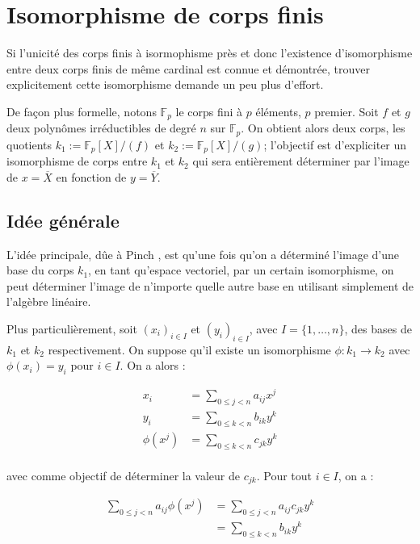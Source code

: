 \documentclass[a4paper]{article} %
\numberwithin{equation}{section}
\begin{document}
\section{Isomorphisme de corps finis}

Si l'unicité des corps finis à isormophisme près et donc l'existence d'isomorphisme entre deux corps finis de même cardinal est connue et démontrée, trouver explicitement cette isomorphisme demande un peu plus d'effort. \par
De façon plus formelle, notons $\mathbb{F}_p$ le corps fini à $p$ éléments, $p$ premier. Soit $f$ et $g$ deux polynômes irréductibles de degré $n$ sur $\mathbb{F}_p$. On obtient alors deux corps, les quotients $k_1 := \mathbb{F}_p[X]/(f)$ et $k_2 := \mathbb{F}_p[X]/(g)$; l'objectif est d'expliciter un isomorphisme de corps entre $k_1$ et $k_2$ qui sera entièrement déterminer par l'image de $x = \overline{X}$ en fonction de $y = \overline{Y}$.

\subsection{Idée générale}
\label{ideegen}

L'idée principale, dûe à Pinch \cite{Pin}, est qu'une fois qu'on a déterminé l'image d'une base du corps $k_1$, en tant qu'espace vectoriel, par un certain isomorphisme, on peut déterminer l'image de n'importe quelle autre base en utilisant simplement de l'algèbre linéaire.\par
Plus particulièrement, soit $(x_i)_{i\in I}$ et $(y_i)_{i\in I}$, avec $I = \lbrace1,\dots,n\rbrace$, des bases de $k_1$ et $k_2$ respectivement. On suppose qu'il existe un isomorphisme $\phi : k_1 \to k_2$ avec $\phi(x_i) = y_i$ pour $i\in I$. On a alors :

\begin{align*}
x_i &= \sum_{0\leq j < n}{a_{ij}x^j}\\
y_i &= \sum_{0\leq k < n}{b_{ik}y^k}\\
\phi(x^j) &= \sum_{0\leq k < n}{c_{jk}y^k}\\
\end{align*}

avec comme objectif de déterminer la valeur de $c_{jk}$. Pour tout $i\in I$, on a : 

\begin{align*}
\sum_{0\leq j < n}{a_{ij}\phi{(x^j)}}&= \sum_{0\leq j < n}{a_{ij}c_{jk}y^k}\\
&= \sum_{0\leq k < n}{b_{ik}y^k}\\
\end{align*}
\end{document}
